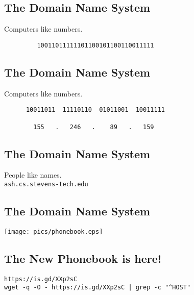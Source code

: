\documentclass[xga]{xdvislides}
\begin{document}
\subsection{The Domain Name System}
\vspace{.5in}
\begin{center}
	\Huge
	Computers like numbers. \\
\vspace{.5in}
\begin{verbatim}
         10011011111101100101100110011111
\end{verbatim}
\end{center}
\Normalsize

\subsection{The Domain Name System}
\vspace{.5in}
\begin{center}
	\Huge
	Computers like numbers. \\
\vspace{.5in}
\begin{verbatim}
      10011011  11110110  01011001  10011111

        155   .   246   .    89   .   159
\end{verbatim}
\end{center}
\Normalsize

\subsection{The Domain Name System}
\vspace{.5in}
\begin{center}
	\Huge
	People like names. \\
\vspace{.5in}
\verb+ash.cs.stevens-tech.edu+
\end{center}
\Normalsize


\subsection{The Domain Name System}
\vspace*{\fill}
\begin{center}
	\texttt{[image: pics/phonebook.eps]}
\end{center}
\vspace*{\fill}

\subsection{The New Phonebook is here!}
\vspace*{\fill}
\begin{center}
	\verb+https://is.gd/XXp2sC+ \\
	\addvspace{.5in}
	\verb+wget -q -O - https://is.gd/XXp2sC | grep -c "^HOST"+
\end{center}
\vspace*{\fill}
\end{document}
